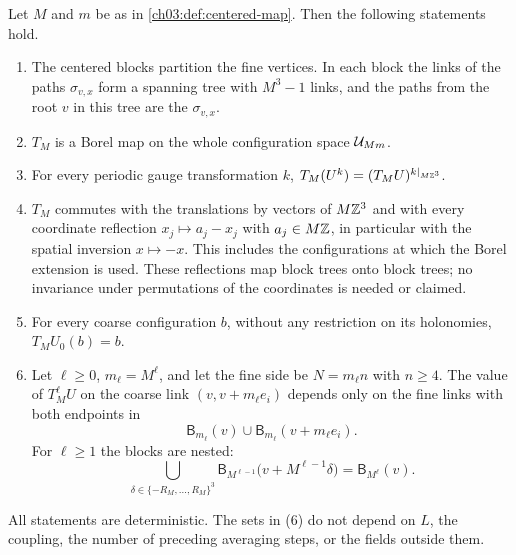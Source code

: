 \begin{proposition}\label{ch03:prop:map-properties}
Let $M$ and $m$ be as in \cref{ch03:def:centered-map}. Then the following statements hold.
\begin{enumerate}
\item The centered blocks partition the fine vertices. In each block the links of the paths $\sigma_{v,x}$ form a spanning tree with $M^3-1$ links, and the paths from the root $v$ in this tree are the $\sigma_{v,x}$.
\item $T_M$ is a Borel map on the whole configuration space $\mathcal U_{Mm}$.
\item For every periodic gauge transformation $k$, $T_M(U^k)=(T_MU)^{k|_{M\mathbb Z^3}}$.
\item $T_M$ commutes with the translations by vectors of $M\mathbb Z^3$ and with every coordinate reflection $x_j\mapsto a_j-x_j$ with $a_j\in M\mathbb Z$, in particular with the spatial inversion $x\mapsto-x$. This includes the configurations at which the Borel extension is used. These reflections map block trees onto block trees; no invariance under permutations of the coordinates is needed or claimed.
\item For every coarse configuration $b$, without any restriction on its holonomies, $T_MU_0(b)=b$.
\item Let $\ell\ge0$, $m_\ell=M^\ell$, and let the fine side be $N=m_\ell n$ with $n\ge4$. The value of $T_M^\ell U$ on the coarse link $(v,v+m_\ell e_i)$ depends only on the fine links with both endpoints in
\[
 \mathsf B_{m_\ell}(v)\cup\mathsf B_{m_\ell}(v+m_\ell e_i).
\]
For $\ell\ge1$ the blocks are nested:
\begin{equation}\label{ch03:eq:nesting}
 \bigcup_{\delta\in\{-R_M,\dots,R_M\}^3}\mathsf B_{M^{\ell-1}}\bigl(v+M^{\ell-1}\delta\bigr)=\mathsf B_{M^\ell}(v).
\end{equation}
\end{enumerate}
All statements are deterministic. The sets in (6) do not depend on $L$, the coupling, the number of preceding averaging steps, or the fields outside them.
\end{proposition}

